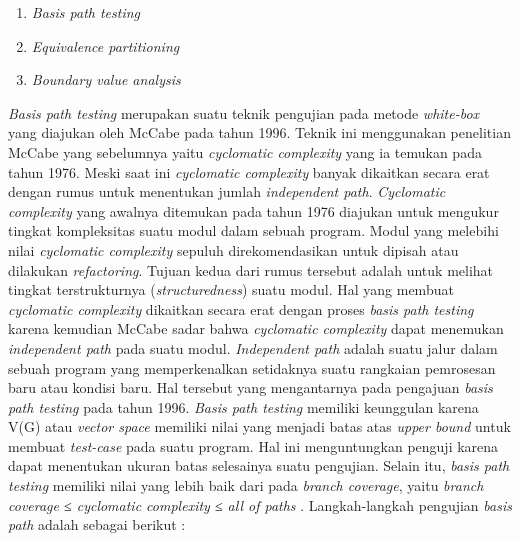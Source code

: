 \begin{enumerate}
\item \emph{Basis path testing}
\item \emph{Equivalence partitioning}
\item \emph{Boundary value analysis }
\end{enumerate}

\emph{Basis path testing} merupakan suatu teknik pengujian pada metode
\emph{white-box} yang diajukan oleh McCabe pada tahun 1996. Teknik ini
menggunakan penelitian McCabe yang sebelumnya yaitu \emph{cyclomatic
complexity} yang ia temukan pada tahun 1976. Meski saat ini \emph{cyclomatic
complexity} banyak dikaitkan secara erat dengan rumus untuk menentukan
jumlah \emph{independent path}. \emph{Cyclomatic complexity} yang awalnya
ditemukan pada tahun 1976 diajukan untuk mengukur tingkat kompleksitas
suatu modul dalam sebuah program. Modul yang melebihi nilai
\emph{cyclomatic complexity} sepuluh direkomendasikan untuk dipisah atau
dilakukan \emph{refactoring}. Tujuan kedua dari rumus tersebut adalah
untuk melihat tingkat terstrukturnya (\emph{structuredness}) suatu
modul. Hal yang membuat \emph{cyclomatic complexity} dikaitkan secara
erat dengan proses \emph{basis path testing} karena kemudian McCabe
sadar bahwa \emph{cyclomatic complexity} dapat menemukan
\emph{independent path} pada suatu modul. \emph{Independent path} adalah
suatu jalur dalam sebuah program yang memperkenalkan setidaknya suatu rangkaian
pemrosesan baru atau kondisi baru. Hal tersebut yang
mengantarnya pada pengajuan \emph{basis path testing} pada tahun 1996.
\emph{Basis path testing} memiliki keunggulan karena V(G) atau
\emph{vector space} memiliki nilai yang menjadi batas atas \emph{upper
bound} untuk membuat \emph{test-case} pada suatu program. Hal ini
menguntungkan penguji karena dapat menentukan ukuran batas selesainya
suatu pengujian. Selain itu, \emph{basis path testing} memiliki nilai
yang lebih baik dari pada \emph{branch coverage}, yaitu \emph{branch
  coverage ≤ cyclomatic complexity ≤ all of paths} \parencite{gregory2007path}.
Langkah-langkah pengujian \emph{basis path} adalah sebagai berikut \parencite{presman2010software}:

